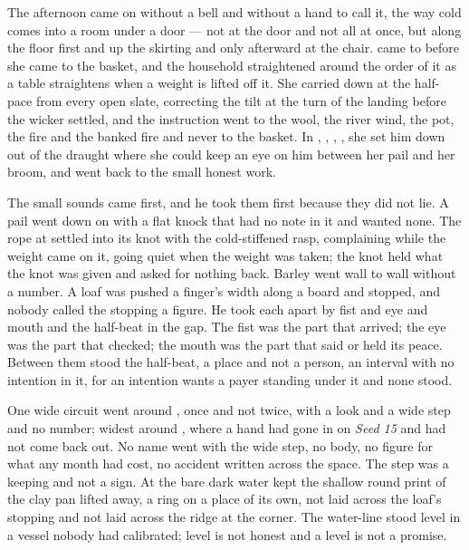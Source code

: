 The afternoon came on without a bell and without a hand to call it, the way cold comes into a room under a door --- not at the door and not all at once, but along the floor first and up the skirting and only afterward at the chair.  came to  before she came to the basket, and the household straightened around the order of it as a table straightens when a weight is lifted off it. She carried  down  at the half-pace from every open slate, correcting the tilt at the turn of the landing before the wicker settled, and the instruction went to the wool, the river wind, the pot, the fire and the banked fire and never to the basket. In , , , , she set him down out of the draught where she could keep an eye on him between her pail and her broom, and went back to the small honest work.

The small sounds came first, and he took them first because they did not lie. A pail went down on  with a flat knock that had no note in it and wanted none. The rope at  settled into its knot with the cold-stiffened rasp, complaining while the weight came on it, going quiet when the weight was taken; the knot held what the knot was given and asked for nothing back. Barley went wall to wall without a number. A loaf was pushed a finger's width along a board and stopped, and nobody called the stopping a figure. He took each apart by fist and eye and mouth and the half-beat in the gap. The fist was the part that arrived; the eye was the part that checked; the mouth was the part that said or held its peace. Between them stood the half-beat, a place and not a person, an interval with no intention in it, for an intention wants a payer standing under it and none stood.

One wide circuit went around , once and not twice, with a look and a wide step and no number; widest around , where a hand had gone in on \emph{Seed 15} and had not come back out. No name went with the wide step, no body, no figure for what any month had cost, no accident written across the space. The step was a keeping and not a sign. At  the bare dark water kept the shallow round print of the clay pan lifted away, a ring on a place of its own, not laid across the loaf's stopping and not laid across the ridge at the corner. The water-line stood level in a vessel nobody had calibrated; level is not honest and a level is not a promise.

